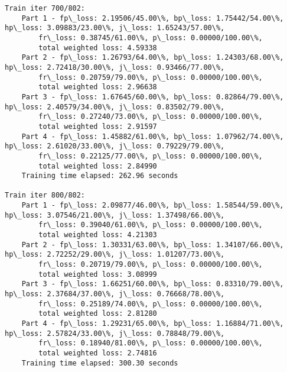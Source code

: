 \documentclass[11pt]{article}
\begin{document}
\begin{Verbatim}[commandchars=\\\{\}]
Train iter 700/802:
	Part 1 - fp\_loss: 2.19506/45.00\%, bp\_loss: 1.75442/54.00\%, hp\_loss: 3.09883/23.00\%, j\_loss: 1.65243/57.00\%, 
		fr\_loss: 0.38745/61.00\%, p\_loss: 0.00000/100.00\%, 
		total weighted loss: 4.59338
	Part 2 - fp\_loss: 1.26793/64.00\%, bp\_loss: 1.24303/68.00\%, hp\_loss: 2.72418/30.00\%, j\_loss: 0.93466/77.00\%, 
		fr\_loss: 0.20759/79.00\%, p\_loss: 0.00000/100.00\%, 
		total weighted loss: 2.96638
	Part 3 - fp\_loss: 1.67645/60.00\%, bp\_loss: 0.82864/79.00\%, hp\_loss: 2.40579/34.00\%, j\_loss: 0.83502/79.00\%, 
		fr\_loss: 0.27240/73.00\%, p\_loss: 0.00000/100.00\%, 
		total weighted loss: 2.91597
	Part 4 - fp\_loss: 1.45882/61.00\%, bp\_loss: 1.07962/74.00\%, hp\_loss: 2.61020/33.00\%, j\_loss: 0.79229/79.00\%, 
		fr\_loss: 0.22125/77.00\%, p\_loss: 0.00000/100.00\%, 
		total weighted loss: 2.84990
	Training time elapsed: 262.96 seconds

Train iter 800/802:
	Part 1 - fp\_loss: 2.09877/46.00\%, bp\_loss: 1.58544/59.00\%, hp\_loss: 3.07546/21.00\%, j\_loss: 1.37498/66.00\%, 
		fr\_loss: 0.39040/61.00\%, p\_loss: 0.00000/100.00\%, 
		total weighted loss: 4.21303
	Part 2 - fp\_loss: 1.30331/63.00\%, bp\_loss: 1.34107/66.00\%, hp\_loss: 2.72252/29.00\%, j\_loss: 1.01207/73.00\%, 
		fr\_loss: 0.20719/79.00\%, p\_loss: 0.00000/100.00\%, 
		total weighted loss: 3.08999
	Part 3 - fp\_loss: 1.66251/60.00\%, bp\_loss: 0.83310/79.00\%, hp\_loss: 2.37684/37.00\%, j\_loss: 0.76668/78.00\%, 
		fr\_loss: 0.25189/74.00\%, p\_loss: 0.00000/100.00\%, 
		total weighted loss: 2.81280
	Part 4 - fp\_loss: 1.29231/65.00\%, bp\_loss: 1.16884/71.00\%, hp\_loss: 2.57824/33.00\%, j\_loss: 0.78848/79.00\%, 
		fr\_loss: 0.18940/81.00\%, p\_loss: 0.00000/100.00\%, 
		total weighted loss: 2.74816
	Training time elapsed: 300.30 seconds


\end{Verbatim}
\end{document}

